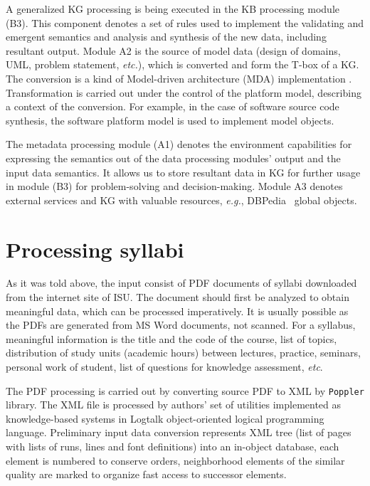 \documentclass[
]{ceurart}
\begin{document}
A generalized KG processing is being executed in the KB processing module (B3).  This component denotes a set of rules used to implement the validating and emergent semantics and analysis and synthesis of the new data, including resultant output.  Module A2 is the source of model data (design of domains, UML, problem statement, \emph{etc.}), which is converted and form the T-box of a KG.  The conversion is a kind of Model-driven architecture (MDA) implementation \cite{b2}.  Transformation is carried out under the control of the platform model, describing a context of the conversion.  For example, in the case of software source code synthesis, the software platform model is used to implement model objects.

The metadata processing module (A1) denotes the environment capabilities for expressing the semantics out of the data processing modules' output and the input data semantics.  It allows us to store resultant data in KG for further usage in module (B3) for problem-solving and decision-making.  Module A3 denotes external services and KG with valuable resources, \emph{e.g.}, DBPedia~\cite{b3} global objects.

\section{Processing syllabi}

As it was told above, the input consist of PDF documents of syllabi downloaded from the internet site of ISU.  The document should first be analyzed to obtain meaningful data, which can be processed imperatively.  It is usually possible as the PDFs are generated from MS Word documents, not scanned.  For a syllabus, meaningful information is the title and the code of the course, list of topics, distribution of study units (academic hours) between lectures, practice, seminars, personal work of student, list of questions for knowledge assessment, \emph{etc}.

The PDF processing is carried out by converting source PDF to XML by \verb|Poppler| library.  The XML file is processed by authors' set of utilities implemented as knowledge-based systems in Logtalk \cite{logtalk} object-oriented logical programming language.  Preliminary input data conversion represents XML tree (list of pages with lists of runs, lines and font definitions) into an in-object database, each element is numbered to conserve orders, neighborhood elements of the similar quality are marked to organize fast access to successor elements.
\end{document}
